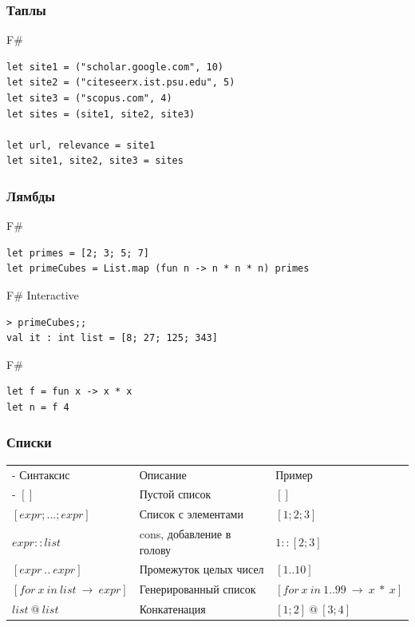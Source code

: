 \documentclass[xetex,mathserif,serif]{beamer}
\begin{document}
	\begin{frame}[fragile]
		\frametitle{Таплы}
		\begin{exampleblock}{F\#}
			\begin{lstlisting}
let site1 = ("scholar.google.com", 10)
let site2 = ("citeseerx.ist.psu.edu", 5)
let site3 = ("scopus.com", 4)
let sites = (site1, site2, site3)

let url, relevance = site1
let site1, site2, site3 = sites
            \end{lstlisting}
		\end{exampleblock}
\end{frame}

	\begin{frame}[fragile]
		\frametitle{Лямбды}
		\begin{exampleblock}{F\#}
			\begin{lstlisting}
let primes = [2; 3; 5; 7]
let primeCubes = List.map (fun n -> n * n * n) primes
            \end{lstlisting}
		\end{exampleblock}
		\begin{alertblock}{F\# Interactive}
			\begin{lstlisting}
> primeCubes;;
val it : int list = [8; 27; 125; 343]
            \end{lstlisting}
		\end{alertblock}
		\begin{exampleblock}{F\#}
			\begin{lstlisting}
let f = fun x -> x * x
let n = f 4
            \end{lstlisting}
		\end{exampleblock}
\end{frame}

	\begin{frame}
		\frametitle{Списки}
		\begin{small}
			\begin{tabu} {| X[0.9 l p] | X[1 l p] | X[1 l p] |}
				\tabucline-
				Синтаксис                               & Описание                  & Пример                             \\
				\tabucline-
				\everyrow{\tabucline-}
				$[]$                                    & Пустой список             & $[]$                               \\
				$[expr; ...; expr]$                     & Список с элементами       & $[1; 2; 3]$                        \\
				$expr :: list$                          & cons, добавление в голову & $1 :: [2; 3]$                      \\
				$[expr\ ..\ expr]$                      & Промежуток целых чисел    & $[1 .. 10]$                        \\
				$[for\ x\ in\ list\ \rightarrow\ expr]$ & Генерированный список     & $[for\ x\ in\ 1..99\ \rightarrow\ x\ *\ x]$ \\					
				$list\ @\ list$                         & Конкатенация              & $[1; 2]\ @\ [3; 4]$                \\					
			\end{tabu}
		\end{small}
	\end{frame}
\end{document}
